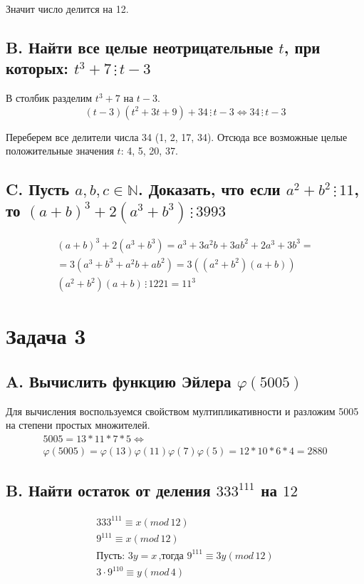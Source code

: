 \documentclass[a4paper,12pt]{article}
\begin{document}
Значит число делится на 12.

\subsection*{B. Найти все целые неотрицательные $t$, при которых: $t^3 + 7 \,\vdots\, t -3$}
В столбик разделим $t^3+7$ на $t-3$. 
$$ (t-3)(t^2+3t+9)+34 \, \vdots \, t-3 \Leftrightarrow 34 \, \vdots \, t-3 $$

Переберем все делители числа 34 (1, 2, 17, 34). Отсюда все возможные целые положительные значения $t$: 4, 5, 20, 37.

\subsection*{C. Пусть $a,b,c \in \mathbb{N}$. Доказать, что если $a^2 + b^2 \,\vdots\, 11$, то $(a+b)^3+2(a^3+b^3) \,\vdots\, 3993$}

\begin{gather*}
    (a+b)^3+2(a^3+b^3) = a^3 + 3a^2 b+3a b^2 + 2a^3 + 3b^3 = \\
    = 3(a^3+b^3+a^2b+ab^2) = 3((a^2+b^2)(a+b)) \\
    (a^2+b^2)(a+b) \, \vdots \, 1221 = 11^3
\end{gather*}

\section*{Задача 3}

\subsection*{A. Вычислить функцию Эйлера $\varphi(5005)$}
Для вычисления воспользуемся свойством мултипликативности и разложим 5005 на степени простых множителей.
\begin{gather*}
    5005 = 13 * 11 * 7 * 5 \Leftrightarrow \\
    \varphi(5005) = \varphi(13)\varphi(11)\varphi(7)\varphi(5) = 12*10*6*4 = 2880
\end{gather*}

\subsection*{B. Найти остаток от деления $333^{111}$ на $12$}
\begin{gather*}
    333^{111} \equiv x(mod\, 12) \\
    9^{111} \equiv x(mod\, 12)\\
    \text{Пусть: } 3y = x \, \text{,тогда } 9^{111} \equiv 3y(mod\, 12) \\
    3 \cdot 9^{110} \equiv y(mod\, 4) \\
\end{gather*}
    
\end{document}
